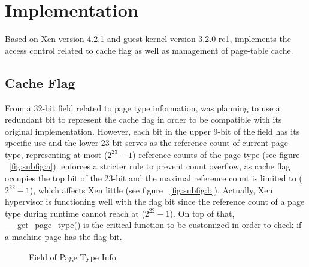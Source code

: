 \section{Implementation} \label{sec:implementation}

Based on Xen version 4.2.1 and guest kernel version 3.2.0-rc1, \name implements the access control related to cache flag as well as management of page-table cache.

\subsection{Cache Flag}

From a 32-bit field related to page type information, \name was planning to use a redundant bit to represent the cache flag in order to be compatible with its original implementation. However, each bit in the upper 9-bit of the field has its specific use and the lower 23-bit serves as the reference count of current page type, representing at most ($2^{23}-1$) reference counts of the page type (see figure ~\ref{fig:subfig:a}). \name enforces a stricter rule to prevent count overflow, as cache flag occupies the top bit of the 23-bit and the maximal reference count is limited to ($2^{22}-1$), which affects Xen little (see figure ~\ref{fig:subfig:b}). Actually, Xen hypervisor is functioning well with the flag bit since the reference count of a page type during runtime cannot reach at ($2^{22}-1$). On top of that, \_\_get\_page\_type() is the critical function to be customized in order to check if a machine page has the flag bit.

\begin{figure}
\centering
{}
\hspace{1in}
\caption{Field of Page Type Info}
\label{fig:PGtime} %
\end{figure}


